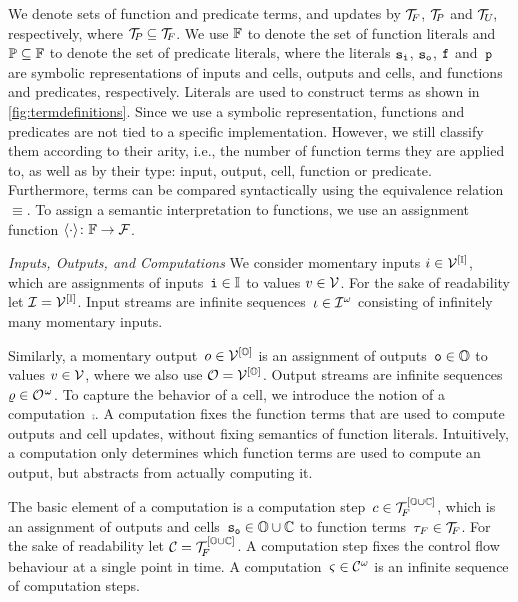We denote sets of function and predicate terms, and updates by
$ \mathcal{T}_{\!F\hspace{-0.5pt}} $, $ \mathcal{T}_{\!P\hspace{-0.5pt}} $ and $ \mathcal{T}_{\hspace{-0.5pt}U \!} $, respectively, where
$ \mathcal{T}_{\!P\hspace{-0.5pt}} \subseteq \mathcal{T}_{\!F\hspace{-0.5pt}} $.  We use $ \mathbb{F} $ to denote the set
of function literals and $ \mathbb{P} \subseteq \mathbb{F} $ to denote the
set of predicate literals, where the literals $ {\text{\texttt{s}}}_{{\text{\texttt{i}}}} $,
$ {\text{\texttt{s}}}_{{\text{\texttt{o}}}} $, $ {\text{\texttt{f}}} $ \linebreak and~$ {\text{\texttt{p}}} $ are
symbolic representations of inputs and cells, outputs and cells, and
functions and predicates, respectively.  Literals are used to
construct terms as shown in \cref{fig:termdefinitions}. Since we use a
symbolic representation, functions and predicates are not tied to a
specific implementation. However, we still classify them according to
their arity, i.e., the number of function terms they are applied to,
as well as by their type: input, output, cell, function or
predicate. Furthermore, terms can be compared syntactically using the
equivalence relation~$ \equiv $.  To assign a semantic interpretation
to functions, we use an assignment function
\mbox{$ \langle \cdot \rangle \colon \mathbb{F} \rightarrow \mathcal{F} $}.

\medskip

\noindent \textit{Inputs, Outputs, and Computations} We consider momentary
inputs \mbox{$ i \in \mathcal{V}^{[\mathbb{I}]} $}, which are
assignments of inputs~$ {\text{\texttt{i}}} \in \mathbb{I} $ to values
$ v \in \mathcal{V} $. For the sake of readability let
$ \mathcal{I} = \mathcal{V}^{[\mathbb{I}]} $. Input streams are infinite
sequences~\mbox{$ \iota \in \mathcal{I}^{\hspace{0.2pt}\omega} $}
consisting of infinitely many momentary inputs.

Similarly, a momentary output~$ o \in \mathcal{V}^{[\mathbb{O}]} $ is
an assignment of outputs~$ {\text{\texttt{o}}} \in \mathbb{O} $ to values
$ v \in \mathcal{V} $, where we also use
$ \mathcal{O} = \mathcal{V}^{[\mathbb{O}]} $. Output streams are infinite
sequences~$ \varrho \in \mathcal{O}^{\hspace{0.5pt}\omega} $. To capture
the behavior of a cell, we introduce the notion of a
computation~$ \comp $.
A computation fixes the function terms that are used to compute outputs and cell updates,
without fixing semantics of function literals.
 Intuitively, a computation only determines which
function terms are used to compute an output, but abstracts from actually
computing it.

The basic element of a computation is a computation
step~$ c \in \mathcal{T}_{\!F\hspace{-0.5pt}}^{[\mathbb{O} \cup \mathbb{C}]} $, which is an
assignment of outputs and
cells~$ {\text{\texttt{s}}}_{{\text{\texttt{o}}}} \in \mathbb{O} \cup \mathbb{C} $ to function
terms~$ \tau_{F} \in \mathcal{T}_{\!F\hspace{-0.5pt}} $. For the sake of readability let
$ \mathcal{C} = \mathcal{T}_{\!F\hspace{-0.5pt}}^{[\mathbb{O} \cup \mathbb{C}]} $. A computation step
fixes the control flow behaviour at a single point in time. A
computation~\mbox{$ \varsigma \in \mathcal{C}^{\omega} $} is an infinite sequence of
computation steps.

